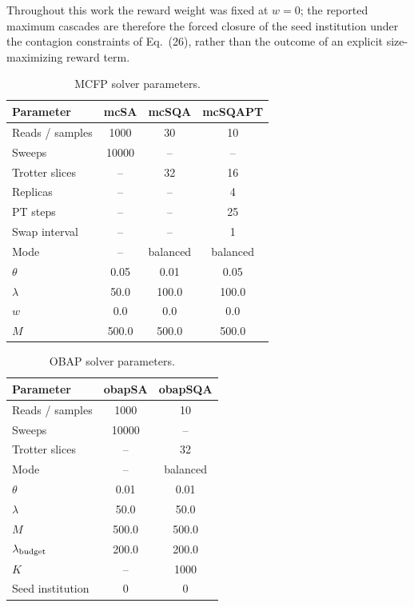\documentclass[aps,reprint,superscriptaddress,pra]{revtex4-2}
\begin{document}
Throughout this work the reward weight was fixed at $w=0$; the reported maximum
cascades are therefore the forced closure of the seed institution under the
contagion constraints of Eq.~(26), rather than the outcome of an explicit
size-maximizing reward term.

\begin{table}[h]
\centering
\caption{MCFP solver parameters.}
\label{tab:mcfp_params}
\begin{tabular}{lccc}
\hline\hline
Parameter & mcSA & mcSQA & mcSQAPT \\
\hline
Reads / samples          & 1000  & 30       & 10       \\
Sweeps                   & 10000 & --       & --       \\
Trotter slices           & --    & 32       & 16       \\
Replicas                 & --    & --       & 4        \\
PT steps                 & --    & --       & 25       \\
Swap interval            & --    & --       & 1        \\
Mode                     & --    & balanced & balanced \\
$\theta$                 & 0.05  & 0.01     & 0.05     \\
$\lambda$                & 50.0  & 100.0    & 100.0    \\
$w$                      & 0.0   & 0.0      & 0.0      \\
$M$                      & 500.0 & 500.0    & 500.0    \\
\hline\hline
\end{tabular}
\end{table}

\begin{table}[H]
\centering
\caption{OBAP solver parameters.}
\label{tab:obap_params}
\begin{tabular}{lcc}
\hline\hline
Parameter & obapSA & obapSQA \\
\hline
Reads / samples         & 1000  & 10       \\
Sweeps                  & 10000 & --       \\
Trotter slices          & --    & 32       \\
Mode                    & --    & balanced \\
$\theta$                & 0.01  & 0.01     \\
$\lambda$               & 50.0  & 50.0     \\
$M$                     & 500.0 & 500.0    \\
$\lambda_{\rm budget}$  & 200.0 & 200.0    \\
$K$                     & --    & 1000     \\
Seed institution        & 0     & 0        \\
\hline\hline
\end{tabular}
\end{table}
\end{document}
